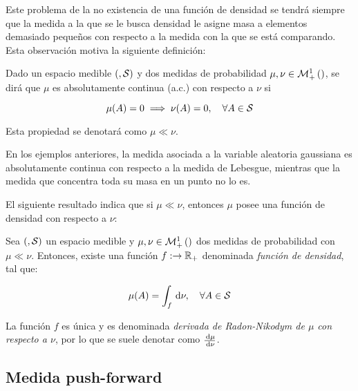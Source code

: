 Este problema de la no existencia de una función de densidad se tendrá siempre que la medida a la que se le busca densidad le asigne masa a elementos demasiado pequeños con respecto a la medida con la que se está comparando. Esta observación motiva la siguiente definición:

\begin{defn}
    \label{defn:absolute_continuity_measures}
    Dado un espacio medible $(,\mathcal{S})$ y dos medidas de probabilidad $\mu,\nu\in\mathcal{M}_+^1\left(\right)$, se dirá que $\mu$ es absolutamente continua (a.c.) con respecto a $\nu$ si

    \begin{equation*}
        \mu(A) = 0 \implies \nu(A)=0,\quad \forall A\in\mathcal{S}
    \end{equation*}

    Esta propiedad se denotará como $\mu\ll\nu$.
\end{defn}

En los ejemplos anteriores, la medida asociada a la variable aleatoria gaussiana es absolutamente continua con respecto a la medida de Lebesgue, mientras que la medida que concentra toda su masa en un punto no lo es.

El siguiente resultado indica que si $\mu\ll\nu$, entonces $\mu$ posee una función de densidad con respecto a $\nu$:

\begin{teo}
    \label{teo:radon_nikodym}
    Sea $(,\mathcal{S})$ un espacio medible y $\mu,\nu\in\mathcal{M}_+^1\left(\right)$ dos medidas de probabilidad con $\mu\ll\nu$. Entonces, existe una función $f:\to\mathbb{R}_+$ denominada \textit{función de densidad}, tal que:

    \begin{equation*}
        \mu(A) = \int_ f \,\operatorname{d}\!\nu, \quad\forall A\in\mathcal{S}
    \end{equation*}

    La función $f$ es única y es denominada \textit{derivada de Radon-Nikodym de $\mu$ con respecto a $\nu$}, por lo que se suele denotar como $\frac{\,\operatorname{d}\!\mu}{\,\operatorname{d}\!\nu}$.
\end{teo}



\subsection{Medida push-forward}
\label{measure_theory/others/push_forward}

